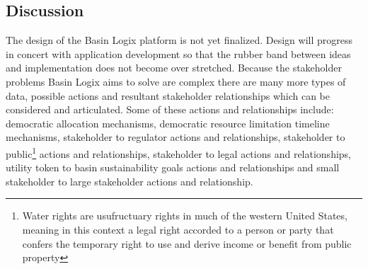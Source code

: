 \documentclass{tufte-handout}
\begin{document}
\subsection{Discussion}\label{sec:headings}

The design of the Basin Logix platform is not yet finalized. Design will progress in concert with application development so that the rubber band between ideas and implementation does not become over stretched. Because the stakeholder problems Basin Logix aims to solve are complex there are many more types of data, possible actions and resultant stakeholder relationships which can be considered and articulated. Some of these actions and relationships include: democratic allocation mechanisms, democratic resource limitation timeline mechanisms, stakeholder to regulator actions and relationships, stakeholder to public\footnote{Water rights are usufructuary rights in much of the western United States, meaning in this context a legal right accorded to a person or party that confers the temporary right to use and derive income or benefit from public property} actions and relationships, stakeholder to legal actions and relationships, utility token to basin sustainability goals actions and relationships and small stakeholder to large stakeholder actions and relationship. 



\end{document}
